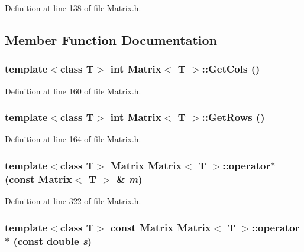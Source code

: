 Definition at line 138 of file Matrix.h.



\subsection{Member Function Documentation}
\hypertarget{classMatrix_a3ea3fe8edc613dc1f3ef33f0f0a06c61}{
\subsubsection[{GetCols}]{\setlength{\rightskip}{0pt plus 5cm}template$<$class T$>$ int {\bf Matrix}$<$ T $>$::GetCols ()}}
\label{classMatrix_a3ea3fe8edc613dc1f3ef33f0f0a06c61}


Definition at line 160 of file Matrix.h.

\hypertarget{classMatrix_abc5ab9d53d31566a17dfc8a24fc60aa6}{
\subsubsection[{GetRows}]{\setlength{\rightskip}{0pt plus 5cm}template$<$class T$>$ int {\bf Matrix}$<$ T $>$::GetRows ()}}
\label{classMatrix_abc5ab9d53d31566a17dfc8a24fc60aa6}


Definition at line 164 of file Matrix.h.

\hypertarget{classMatrix_ae9307b29ba230013f0fce5ebf8e7fecd}{
\subsubsection[{operator$\ast$}]{\setlength{\rightskip}{0pt plus 5cm}template$<$class T$>$ {\bf Matrix} {\bf Matrix}$<$ T $>$::operator$\ast$ (const {\bf Matrix}$<$ T $>$ \& {\em m})}}
\label{classMatrix_ae9307b29ba230013f0fce5ebf8e7fecd}


Definition at line 322 of file Matrix.h.

\hypertarget{classMatrix_ac4e94b307c56a15fb47a9255855f94a9}{
\subsubsection[{operator$\ast$}]{\setlength{\rightskip}{0pt plus 5cm}template$<$class T$>$ const {\bf Matrix} {\bf Matrix}$<$ T $>$::operator$\ast$ (const double {\em s})}}
\label{classMatrix_ac4e94b307c56a15fb47a9255855f94a9}


